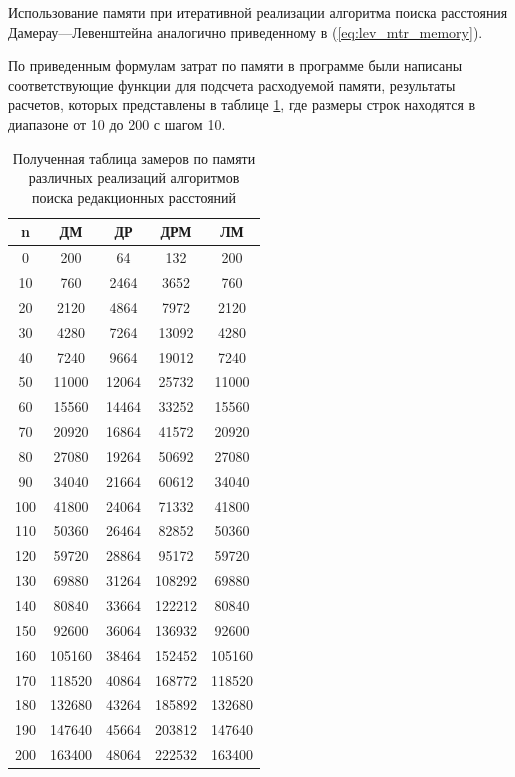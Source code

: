 Использование памяти при итеративной реализации алгоритма поиска расстояния Дамерау---Левенштейна аналогично приведенному
в (\ref{eq:lev_mtr_memory}).

По приведенным формулам затрат по памяти в программе были написаны соответствующие функции для подсчета расходуемой памяти, результаты расчетов, которых представлены в таблице \ref{t:memory}, где размеры строк находятся в диапазоне от 10 до 200 с шагом 10.

\clearpage

\begin{table}[!ht]
    \centering
    \caption{Полученная таблица замеров по памяти различных реализаций алгоритмов поиска редакционных расстояний}
    \begin{tabular}{|c|c|c|c|c|}
    \hline
        n & ДМ & ДР & ДРМ & ЛМ \\ \hline
        0 & 200 & 64 & 132 & 200 \\ \hline
        10 & 760 & 2464 & 3652 & 760 \\ \hline
        20 & 2120 & 4864 & 7972 & 2120 \\ \hline
        30 & 4280 & 7264 & 13092 & 4280 \\ \hline
        40 & 7240 & 9664 & 19012 & 7240 \\ \hline
        50 & 11000 & 12064 & 25732 & 11000 \\ \hline
        60 & 15560 & 14464 & 33252 & 15560 \\ \hline
        70 & 20920 & 16864 & 41572 & 20920 \\ \hline
        80 & 27080 & 19264 & 50692 & 27080 \\ \hline
        90 & 34040 & 21664 & 60612 & 34040 \\ \hline
        100 & 41800 & 24064 & 71332 & 41800 \\ \hline
        110 & 50360 & 26464 & 82852 & 50360 \\ \hline
        120 & 59720 & 28864 & 95172 & 59720 \\ \hline
        130 & 69880 & 31264 & 108292 & 69880 \\ \hline
        140 & 80840 & 33664 & 122212 & 80840 \\ \hline
        150 & 92600 & 36064 & 136932 & 92600 \\ \hline
        160 & 105160 & 38464 & 152452 & 105160 \\ \hline
        170 & 118520 & 40864 & 168772 & 118520 \\ \hline
        180 & 132680 & 43264 & 185892 & 132680 \\ \hline
        190 & 147640 & 45664 & 203812 & 147640 \\ \hline
        200 & 163400 & 48064 & 222532 & 163400 \\ \hline
    \end{tabular}
     \label{t:memory}
\end{table}



